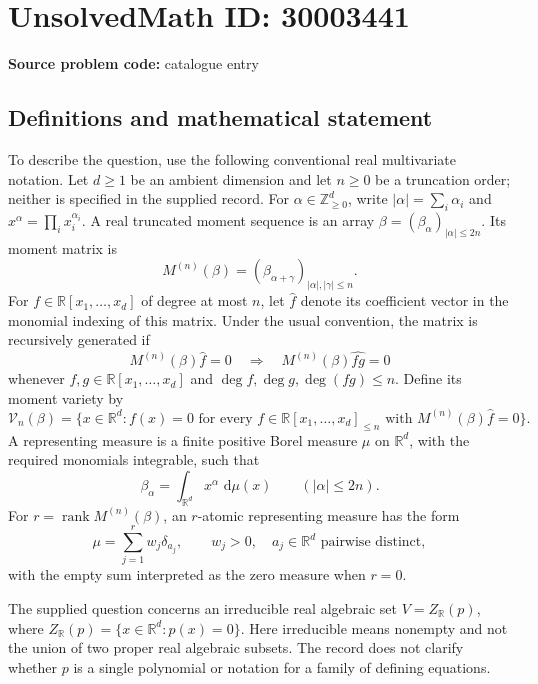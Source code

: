 \documentclass[11pt]{article}
\newcommand{\Z}{\mathbb{Z}}
\newcommand{\R}{\mathbb{R}}
\newcommand{\dd}{\,\mathrm{d}}
\begin{document}
\section*{UnsolvedMath ID: 30003441}
\textbf{Source problem code:} catalogue entry
\subsection{Definitions and mathematical statement}
To describe the question, use the following conventional real multivariate notation. Let \(d\geq 1\) be an ambient dimension and let \(n\geq 0\) be a truncation order; neither is specified in the supplied record. For \(\alpha\in\Z_{\geq 0}^d\), write \(|\alpha|=\sum_i\alpha_i\) and \(x^\alpha=\prod_i x_i^{\alpha_i}\). A real truncated moment sequence is an array \(\beta=(\beta_\alpha)_{|\alpha|\leq 2n}\). Its moment matrix is
\[
M^{(n)}(\beta)=(\beta_{\alpha+\gamma})_{|\alpha|,|\gamma|\leq n}.
\]
For \(f\in\R[x_1,\ldots,x_d]\) of degree at most \(n\), let \(\widehat f\) denote its coefficient vector in the monomial indexing of this matrix. Under the usual convention, the matrix is recursively generated if
\[
M^{(n)}(\beta)\widehat f=0
\quad\Longrightarrow\quad
M^{(n)}(\beta)\widehat{fg}=0
\]
whenever \(f,g\in\R[x_1,\ldots,x_d]\) and \(\deg f,\deg g,\deg(fg)\leq n\). Define its moment variety by
\[
\mathcal V_n(\beta)=\{x\in\R^d:f(x)=0\text{ for every }f\in\R[x_1,\ldots,x_d]_{\leq n}\text{ with }M^{(n)}(\beta)\widehat f=0\}.
\]
A representing measure is a finite positive Borel measure \(\mu\) on \(\R^d\), with the required monomials integrable, such that
\[
\beta_\alpha=\int_{\R^d}x^\alpha\,\dd\mu(x)\qquad(|\alpha|\leq 2n).
\]
For \(r=\operatorname{rank}M^{(n)}(\beta)\), an \(r\)-atomic representing measure has the form
\[
\mu=\sum_{j=1}^{r}w_j\delta_{a_j},\qquad w_j>0,\quad a_j\in\R^d\text{ pairwise distinct},
\]
with the empty sum interpreted as the zero measure when \(r=0\).

The supplied question concerns an irreducible real algebraic set \(V=Z_{\R}(p)\), where \(Z_{\R}(p)=\{x\in\R^d:p(x)=0\}\). Here irreducible means nonempty and not the union of two proper real algebraic subsets. The record does not clarify whether \(p\) is a single polynomial or notation for a family of defining equations.
\end{document}
